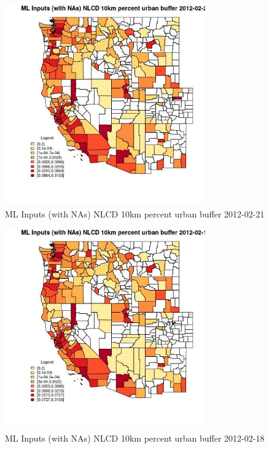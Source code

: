 \begin{figure} 
\centering  
\includegraphics[width=0.77\textwidth]{Code_Outputs/Report_ML_input_PM25_Step4_part_f_de_duplicated_aveswNAs_CountyNLCD_10km_percent_urban_bufferMean2012-02-21.jpg} 
\caption{\label{fig:Report_ML_input_PM25_Step4_part_f_de_duplicated_aveswNAsCountyNLCD_10km_percent_urban_bufferMean2012-02-21}ML Inputs (with NAs) NLCD 10km percent urban buffer 2012-02-21} 
\end{figure} 
 

\begin{figure} 
\centering  
\includegraphics[width=0.77\textwidth]{Code_Outputs/Report_ML_input_PM25_Step4_part_f_de_duplicated_aveswNAs_CountyNLCD_10km_percent_urban_bufferMean2012-02-18.jpg} 
\caption{\label{fig:Report_ML_input_PM25_Step4_part_f_de_duplicated_aveswNAsCountyNLCD_10km_percent_urban_bufferMean2012-02-18}ML Inputs (with NAs) NLCD 10km percent urban buffer 2012-02-18} 
\end{figure} 
 


